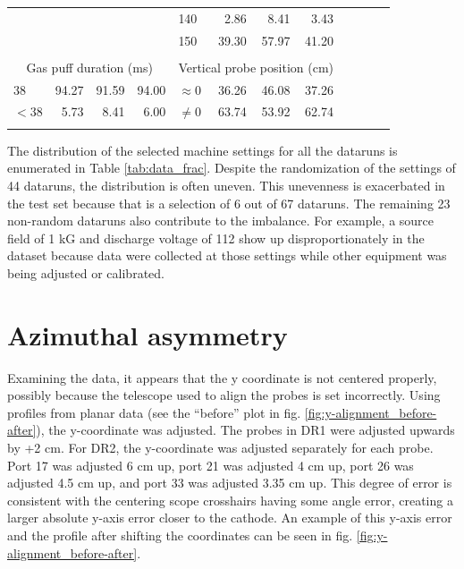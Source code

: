 \begin{table}
\begin{tabular}{lrrr|lrrr|lrrr}
                      & & & & 140 & 2.86 & 8.41 & 3.43     &                       & & & \\
                      & & & & 150 & 39.30 & 57.97 & 41.20  &                       & & & \\
		\\
		\multicolumn{4}{c|}{Gas puff duration (ms)} & \multicolumn{4}{c}{Vertical probe position (cm)}\\
		\cline{0-7} \cline{0-7}
		$38$ & 94.27 & 91.59 & 94.00 & $\approx 0$ & 36.26 & 46.08 & 37.26 & \\
		$<38$ & 5.73 & 8.41 & 6.00    & $\neq 0$ & 63.74 & 53.92 & 62.74    & \\
		\multicolumn{12}{l}{}
	\end{tabular}
\end{table}


The distribution of the selected machine settings for all the dataruns is enumerated in Table \ref{tab:data_frac}. Despite the randomization of the settings of 44 dataruns, the distribution is often uneven. This unevenness is exacerbated in the test set because that is a selection of 6 out of 67 dataruns. The remaining 23 non-random dataruns also contribute to the imbalance. For example, a source field of 1 kG and discharge voltage of 112 show up disproportionately in the dataset because data were collected at those settings while other equipment was being adjusted or calibrated.


\section{Azimuthal asymmetry}

Examining the data, it appears that the y coordinate is not centered properly, possibly because the telescope used to align the probes is set incorrectly. Using profiles from planar data (see the ``before'' plot in fig. \ref{fig:y-alignment_before-after}), the y-coordinate was adjusted. The probes in DR1 were adjusted upwards by +2 cm. For DR2, the y-coordinate was adjusted separately for each probe. Port 17 was adjusted 6 cm up, port 21 was adjusted 4 cm up, port 26 was adjusted 4.5 cm up, and port 33 was adjusted 3.35 cm up. This degree of error is consistent with the centering scope crosshairs having some angle error, creating a larger absolute y-axis error closer to the cathode. An example of this y-axis error and the profile after shifting the coordinates can be seen in fig. \ref{fig:y-alignment_before-after}.


